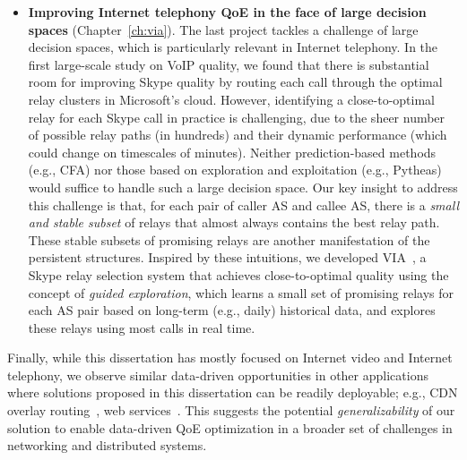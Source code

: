 \begin{itemize}
\item {\bf Improving Internet telephony QoE in the face of large decision spaces} 
(Chapter~\ref{ch:via}).
The last project tackles a challenge of large decision spaces, which 
is particularly relevant in Internet telephony.
In the first large-scale study on VoIP quality, we found that 
there is substantial room for improving Skype quality by routing each 
call through the optimal relay clusters in Microsoft's cloud.
However, identifying a close-to-optimal relay for each Skype call in practice 
is challenging, 
due to the sheer number of possible relay paths 
(in hundreds) and their dynamic performance (which could change 
on timescales of minutes). Neither prediction-based methods (e.g., 
CFA) nor those based on 
exploration and exploitation (e.g., Pytheas) would suffice to handle such a 
large decision space.
Our key insight to address this challenge is that, for each pair of caller 
AS and callee AS, there is a {\em small and stable subset} of relays that 
almost always contains the best relay path. These stable subsets of promising
relays are another manifestation of the persistent structures.
Inspired by these intuitions, we developed {VIA}~\cite{via}, 
a Skype relay selection system that achieves close-to-optimal quality 
using the concept of {\em guided exploration},
which learns a small set of promising relays for each 
AS pair based on long-term (e.g., daily) historical data, and 
explores these relays using most calls in real time.

\end{itemize}

%
Finally, while this dissertation has mostly focused on 
Internet video and Internet telephony, 
we observe similar data-driven opportunities in other applications
where solutions proposed in this dissertation can be readily 
deployable; e.g., CDN overlay routing~\cite{mukerjee2015practical}, 
web services~\cite{footprint}.
This suggests the potential {\em generalizability} of our solution to enable
data-driven QoE optimization in a broader set of challenges in 
networking and distributed systems.


